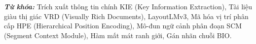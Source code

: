 \textbf{\textit{Từ khóa:}} Trích xuất thông tin chính KIE (Key Information Extraction), Tài liệu giàu thị giác VRD (Visually Rich Documents), LayoutLMv3, Mã hóa vị trí phân cấp HPE (Hierarchical Position Encoding), Mô-đun ngữ cảnh phân đoạn SCM (Segment Context Module), Hàm mất mát ranh giới, Gán nhãn chuỗi BIO.

